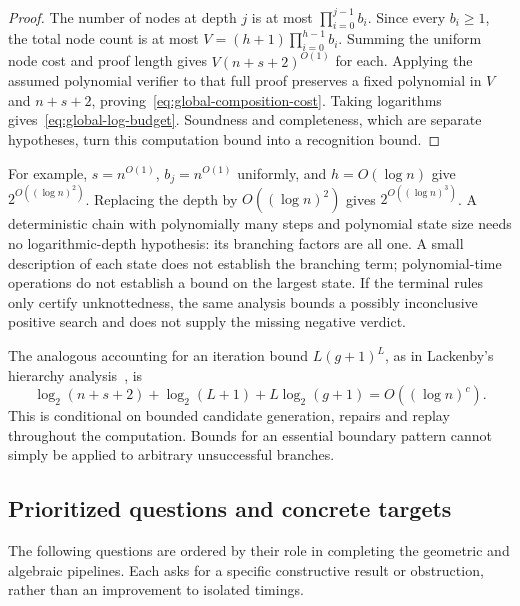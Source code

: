 \begin{proof}
The number of nodes at depth $j$ is at most
$\prod_{i=0}^{j-1}b_i$. Since every $b_i\ge1$, the total node count is
at most $V=(h+1)\prod_{i=0}^{h-1}b_i$. Summing the uniform node cost
and proof length gives $V(n+s+2)^{O(1)}$ for each. Applying the assumed
polynomial verifier to that full proof preserves a fixed polynomial in
$V$ and $n+s+2$, proving~\eqref{eq:global-composition-cost}. Taking
logarithms gives~\eqref{eq:global-log-budget}. Soundness and completeness,
which are separate hypotheses, turn this computation bound into a
recognition bound.
\end{proof}

For example, $s=n^{O(1)}$, $b_j=n^{O(1)}$ uniformly, and
$h=O(\log n)$ give $2^{O((\log n)^2)}$. Replacing the depth by
$O((\log n)^2)$ gives $2^{O((\log n)^3)}$. A deterministic chain with
polynomially many steps and polynomial state size needs no logarithmic-depth
hypothesis: its branching factors are all one. A small description of each
state does not establish the branching term; polynomial-time operations
do not establish a bound on the largest state. If the terminal rules
only certify unknottedness, the same analysis bounds a possibly
inconclusive positive search and does not supply the missing negative
verdict.

The analogous accounting for an iteration bound $L(g+1)^L$, as in
Lackenby's hierarchy analysis~\cite[Proposition 9.1]{lackenby2026}, is
\[
 \log_2(n+s+2)+\log_2(L+1)+L\log_2(g+1)
                  =O((\log n)^c).
\]
This is conditional on bounded candidate generation, repairs and replay
throughout the computation. Bounds for an essential boundary pattern
cannot simply be applied to arbitrary unsuccessful branches.

\subsection{Prioritized questions and concrete targets}

The following questions are ordered by their role in completing the
geometric and algebraic pipelines. Each asks for a specific constructive
result or obstruction, rather than an improvement to isolated timings.

